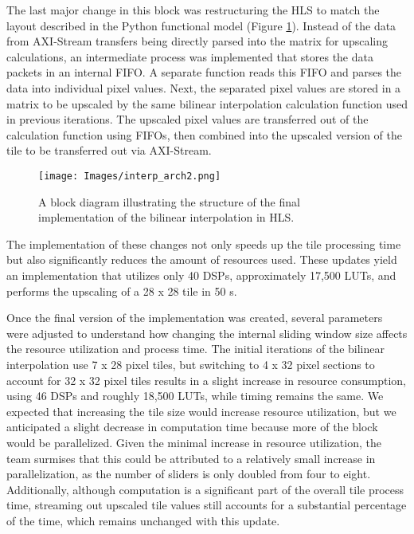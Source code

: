 \documentclass{article}
\begin{document}
                \par The last major change in this block was restructuring the HLS to match the layout described in the Python functional model (Figure \ref{fig:bilin_arch_v2}). Instead of the data from AXI-Stream transfers being directly parsed into the matrix for upscaling calculations, an intermediate process was implemented that stores the data packets in an internal FIFO. A separate function reads this FIFO and parses the data into individual pixel values. Next, the separated pixel values are stored in a matrix to be upscaled by the same bilinear interpolation calculation function used in previous iterations. The upscaled pixel values are transferred out of the calculation function using FIFOs, then combined into the upscaled version of the tile to be transferred out via AXI-Stream.
                \begin{figure}[!tb] 
                    \centering
                    \texttt{[image: Images/interp\_arch2.png]} 
                    \caption{A block diagram illustrating the structure of the final implementation of the bilinear interpolation in HLS.}
                    \label{fig:bilin_arch_v2} 
                \end{figure}
                \par The implementation of these changes not only speeds up the tile processing time but also significantly reduces the amount of resources used. These updates yield an implementation that utilizes only 40 DSPs, approximately 17,500 LUTs, and performs the upscaling of a 28 x 28 tile in 50  \textmu s. 
                \par Once the final version of the implementation was created, several parameters were adjusted to understand how changing the internal sliding window size affects the resource utilization and process time. The initial iterations of the bilinear interpolation use 7 x 28 pixel tiles, but switching to 4 x 32 pixel sections to account for 32 x 32 pixel tiles results in a slight increase in resource consumption, using 46 DSPs and roughly 18,500 LUTs, while timing remains the same. We expected that increasing the tile size would increase resource utilization, but we anticipated a slight decrease in computation time because more of the block would be parallelized. Given the minimal increase in resource utilization, the team surmises that this could be attributed to a relatively small increase in parallelization, as the number of sliders is only doubled from four to eight. Additionally, although computation is a significant part of the overall tile process time, streaming out upscaled tile values still accounts for a substantial percentage of the time, which remains unchanged with this update.
                
\end{document}
